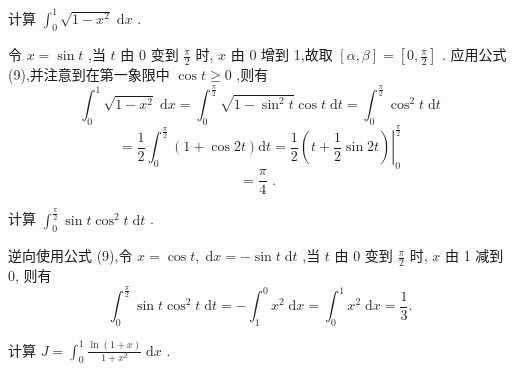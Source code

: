 \begin{example}

\end{example}
计算 \({\int }_{0}^{1}\sqrt{1 - {x}^{2}}\mathrm{\;d}x\) .

\begin{solution}

\end{solution}
令 \(x = \sin t\) ,当 \(t\) 由 0 变到 \(\frac{\pi }{2}\) 时, \(x\) 由 0 增到 1,故取 \(\left\lbrack  {\alpha ,\beta }\right\rbrack   = \left\lbrack  {0,\frac{\pi }{2}}\right\rbrack\) . 应用公式 (9),并注意到在第一象限中 \(\cos t \geq  0\) ,则有
\[
{\int }_{0}^{1}\sqrt{1 - {x}^{2}}\mathrm{\;d}x = {\int }_{0}^{\frac{\pi }{2}}\sqrt{1 - {\sin }^{2}t}\cos t\mathrm{\;d}t = {\int }_{0}^{\frac{\pi }{2}}{\cos }^{2}t\mathrm{\;d}t
\]
\[
= \frac{1}{2}{\int }_{0}^{\frac{\pi }{2}}\left( {1 + \cos {2t}}\right) \mathrm{d}t = {\left. \frac{1}{2}\left( t + \frac{1}{2}\sin 2t\right) \right| }_{0}^{\frac{\pi }{2}}
\]
\[
= \frac{\pi }{4}\text{ . }
\]
\begin{example}

\end{example}
计算 \({\int }_{0}^{\frac{\pi }{2}}\sin t{\cos }^{2}t\mathrm{\;d}t\) .

\begin{solution}

\end{solution}
逆向使用公式 (9),令 \(x = \cos t,\mathrm{\;d}x =  - \sin t\mathrm{\;d}t\) ,当 \(t\) 由 0 变到 \(\frac{\pi }{2}\) 时, \(x\) 由 1 减到 0, 则有
\[
{\int }_{0}^{\frac{\pi }{2}}\sin t{\cos }^{2}t\mathrm{\;d}t =  - {\int }_{1}^{0}{x}^{2}\mathrm{\;d}x = {\int }_{0}^{1}{x}^{2}\mathrm{\;d}x = \frac{1}{3}.
\]
\begin{example}

\end{example}
计算 \(J = {\int }_{0}^{1}\frac{\ln \left( {1 + x}\right) }{1 + {x}^{2}}\mathrm{\;d}x\) .

